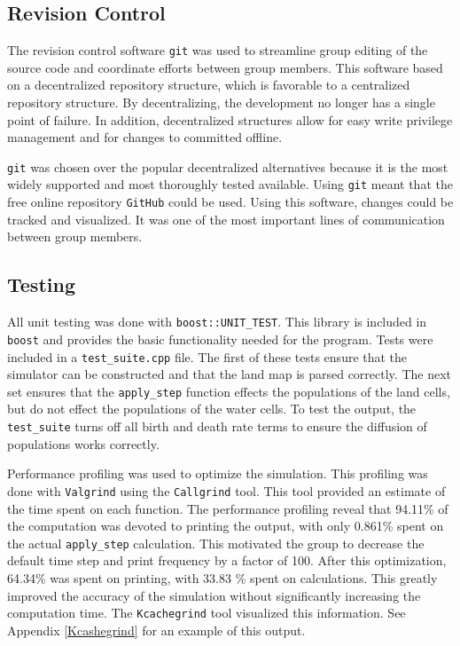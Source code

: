 \documentclass[a4paper,11pt]{article}
\begin{document}
\subsection{Revision Control}

The revision control software \texttt{git} was used to streamline group editing of the source code and coordinate efforts between group members.  This software based on a decentralized repository structure, which is favorable to a centralized repository structure.  By decentralizing, the development no longer has a single point of failure.  In addition, decentralized structures allow for easy write privilege management and for changes to committed offline.

\texttt{git} was chosen over the popular decentralized alternatives because it is the most widely supported and most thoroughly tested available.  Using \texttt{git} meant that the free online repository \texttt{GitHub} could be used.  Using this software, changes could be tracked and visualized.  It was one of the most important lines of communication between group members.


\subsection{Testing}\label{test}

All unit testing was done with \texttt{boost::UNIT\_TEST}.  This library is included in \texttt{boost} and provides the basic functionality needed for the program.  Tests were included in a \texttt{test\_suite.cpp} file.  The first of these tests ensure that the simulator can be constructed and that the land map is parsed correctly.  The next set ensures that the \texttt{apply\_step} function effects the populations of the land cells, but do not effect the populations of the water cells.  To test the output, the \texttt{test\_suite} turns off all birth and death rate terms to ensure the diffusion of populations works correctly.   

Performance profiling was used to optimize the simulation.  This profiling was done with \texttt{Valgrind} using the \texttt{Callgrind} tool.  This tool provided an estimate of the time spent on each function. The performance profiling reveal that 94.11\% of the computation was devoted to printing the output, with only 0.861\% spent on the actual \texttt{apply\_step} calculation.  This motivated the group to decrease the default time step and print frequency by a factor of 100.  After this optimization, 64.34\% was spent on printing, with 33.83 \% spent on calculations.  This greatly improved the accuracy of the simulation without significantly increasing the computation time.  The \texttt{Kcachegrind} tool visualized this information.  See Appendix \ref{Kcashegrind} for an example of this output. 
\end{document}
